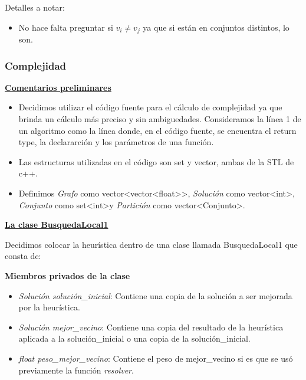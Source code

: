 \documentclass[10pt,a4paper]{article}
\begin{document}
Detalles a notar:
\begin{itemize}
\item No hace falta preguntar si $v_i \neq v_j$ ya que si están en conjuntos distintos, lo son.
\end{itemize}

\subsubsection{Complejidad}
\noindent \textbf{\underline{Comentarios preliminares}}
\begin{itemize}
\item Decidimos utilizar el código fuente para el cálculo de complejidad ya que brinda un cálculo más preciso y sin ambiguedades. Consideramos la línea 1 de un algoritmo como la línea donde, en el código fuente, se encuentra el return type, la declararción y los parámetros de una función.
\item Las estructuras utilizadas en el código son set y vector, ambas de la STL de c++.
\item Definimos \textit{Grafo} como vector\textless vector\textless float\textgreater \textgreater, \textit{Solución} como vector\textless int\textgreater, \textit{Conjunto} como set\textless int\textgreater y \textit{Partición} como vector\textless Conjunto\textgreater .
\end{itemize}

\noindent \textbf{\underline{La clase BusquedaLocal1}}

Decidimos colocar la heurística dentro de una clase llamada BusquedaLocal1 que consta de:

\textbf{Miembros privados de la clase}
\begin{itemize}
\item \textit{Solución solución\_inicial}: Contiene una copia de la solución a ser mejorada por la heurística.
\item \textit{Solución mejor\_vecino}: Contiene una copia del resultado de la heurística aplicada a la solución\_inicial o una copia de la solución\_inicial.
\item \textit{float peso\_mejor\_vecino}: Contiene el peso de mejor\_vecino si es que se usó previamente la función \textit{resolver}.
\end{itemize}
\end{document}

